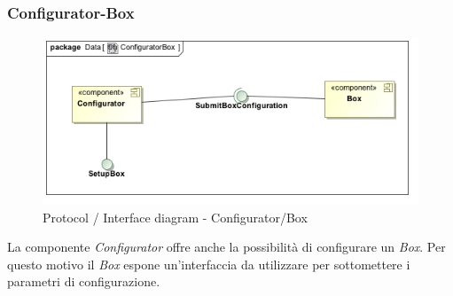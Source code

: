 \subsubsection{Configurator-Box}
\begin{center}
\begin{figure}[h!]
	\includegraphics[scale=0.55]{img/InteractionDiagram/Implementation_Diagram__ConfiguratorBox.jpg}
\caption{Protocol / Interface diagram - Configurator/Box}
\end{figure}
\end{center}
La componente \emph{Configurator} offre anche la possibilit\`{a} di configurare un \emph{Box}. Per questo motivo il \emph{Box} espone un'interfaccia
da utilizzare per sottomettere i parametri di configurazione. 
